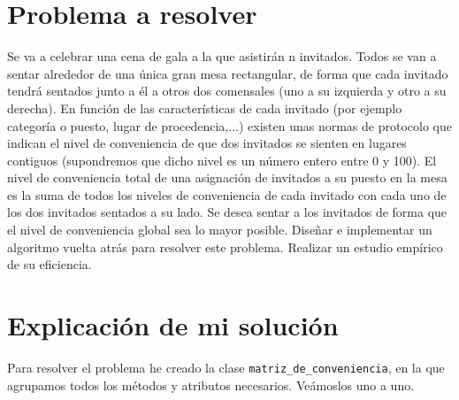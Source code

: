 \documentclass[12pt]{article}
\begin{document}
\section{Problema a resolver}
Se va a celebrar una cena de gala a la que asistirán n invitados. Todos se van a sentar alrededor de una única
gran mesa rectangular, de forma que cada invitado tendrá sentados junto a él a otros dos comensales (uno a
su izquierda y otro a su derecha). En función de las características de cada invitado (por ejemplo categoría
o puesto, lugar de procedencia,...) existen unas normas de protocolo que indican el nivel de conveniencia de
que dos invitados se sienten en lugares contiguos (supondremos que dicho nivel es un número entero entre
0 y 100). El nivel de conveniencia total de una asignación de invitados a su puesto en la mesa es la suma
de todos los niveles de conveniencia de cada invitado con cada uno de los dos invitados sentados a su lado.
Se desea sentar a los invitados de forma que el nivel de conveniencia global sea lo mayor posible. Diseñar
e implementar un algoritmo vuelta atrás para resolver este problema. Realizar un estudio empírico de su
eficiencia.

\section{Explicación de mi solución}
Para resolver el problema he creado la clase \verb|matriz_de_conveniencia|, en la que agrupamos todos los métodos y atributos necesarios. Veámoslos uno a uno.
\end{document}
